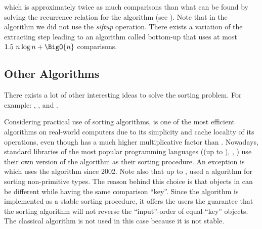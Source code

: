 which is approximately twice as much comparisons than what can be found by
solving the recurrence relation for the \mergesort algorithm (see
\citet*{OEIS:A001855}). Note that in the \heapsort algorithm we did not use the
\emph{siftup} operation. There exists \cite{wegener:1993} a variation of the
extracting step leading to an algorithm called bottom-up \heapsort that uses at
most \(1.5~n \log n + \BigO{n}\) comparisons.

\subsection*{Other Algorithms}

There exists a lot of other interesting ideas to solve the sorting problem. For
example: \shellsort \cite{shell:1959}, \smoothsort \cite{dijkstra:1982},
\introsort \cite{musser:1997} and \timsort \cite{martelli:2006}.

Considering practical use of sorting algorithms, \quicksort is one of the most
efficient algorithms on real-world computers due to its simplicity and cache
locality of its operations, even though \quicksort has a much higher
multiplicative factor than \mergesort. Nowadays, standard libraries of the most
popular programming languages (\Java (up to ), \CC, \CXX) use their own
version of the \quicksort algorithm as their sorting procedure. An exception is
\Python which uses the \timsort algorithm since 2002. Note also that up to , \Java used a \mergesort algorithm for sorting non-primitive types. The
reason behind this choice is that objects in \Java can be different while
having the same comparison ``key''. Since the \Java \mergesort algorithm is
implemented as a stable sorting procedure, it offers the users the guarantee
that the sorting algorithm will not reverse the ``input''-order of equal-``key'' objects.
The classical \quicksort algorithm is not used in this case because it is not
stable.

